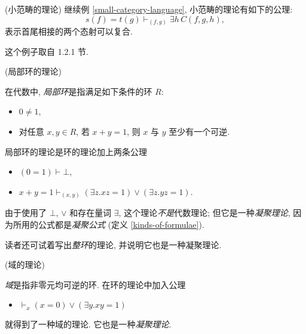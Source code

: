 %    

\begin{example}
	{(小范畴的理论)}
	继续例 \ref{small-category-language}, 小范畴的理论有如下的公理:
	$$
	s(f)=t(g)\vdash_{(f,g)}\exists h\, C(f,g,h),
	$$
	表示首尾相接的两个态射可以复合.
	
	这个例子取自 \cite{TST} 1.2.1 节.
\end{example}

\begin{example}
	{(局部环的理论)}
	
	在代数中, \emph{局部环}\footnotemark{}是指满足如下条件的环 $R$:
	\begin{itemize}
		\item $0\neq 1$,
		\item 对任意 $x,y\in R$, 若 $x+y=1$, 则 $x$ 与 $y$ 至少有一个可逆.
	\end{itemize}
	
	局部环的理论是环的理论加上两条公理
	\begin{itemize}
		\item $(0=1)\vdash \bot$,
		\item $x+y=1\vdash_{(x,y)} (\exists z. xz=1)\vee (\exists z. yz=1)$.
	\end{itemize}
	
	由于使用了 $\bot$, $\vee$ 和存在量词 $\exists$, 这个理论\emph{不是}代数理论; 但它是一种\emph{凝聚理论}, 因为所用的公式都是\emph{凝聚公式} (定义 \ref{kinds-of-formulae}).
	
	读者还可试着写出\emph{整环}的理论, 并说明它也是一种凝聚理论.
\end{example}


\begin{example}
	{(域的理论)}
	
	\emph{域}是指非零元均可逆的环. 在环的理论中加入公理
	\begin{itemize}
		\item $\vdash_x (x=0) \lor (\exists y. xy=1)$
	\end{itemize}
	就得到了一种域的理论\footnotemark. 它也是一种\emph{凝聚理论}.
\end{example}


